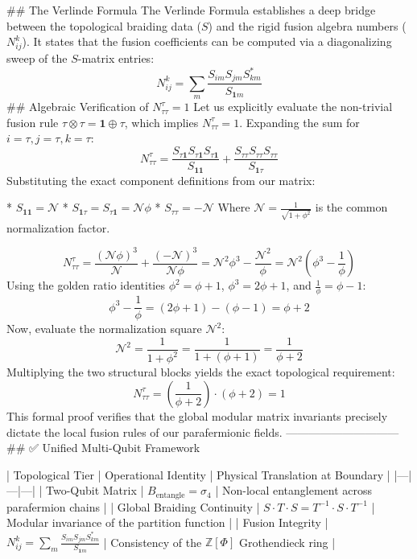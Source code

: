 ## The Verlinde Formula
The Verlinde Formula establishes a deep bridge between the topological braiding data ($S$) and the rigid fusion algebra numbers ($N_{ij}^k$). It states that the fusion coefficients can be computed via a diagonalizing sweep of the $S$-matrix entries:
$$N_{ij}^k = \sum_{m} \frac{S_{im} S_{jm} S_{km}^*}{S_{\mathbf{1}m}}$$ 
## Algebraic Verification of $N_{\tau\tau}^\tau = 1$
Let us explicitly evaluate the non-trivial fusion rule $\tau \otimes \tau = \mathbf{1} \oplus \tau$, which implies $N_{\tau\tau}^\tau = 1$. Expanding the sum for $i=\tau, j=\tau, k=\tau$:
$$N_{\tau\tau}^\tau = \frac{S_{\tau \mathbf{1}} S_{\tau \mathbf{1}} S_{\tau \mathbf{1}}}{S_{\mathbf{1}\mathbf{1}}} + \frac{S_{\tau \tau} S_{\tau \tau} S_{\tau \tau}}{S_{\mathbf{1}\tau}}$$ 
Substituting the exact component definitions from our matrix:

* $S_{\mathbf{1}\mathbf{1}} = \mathcal{N}$
* $S_{\mathbf{1}\tau} = S_{\tau \mathbf{1}} = \mathcal{N}\phi$
* $S_{\tau\tau} = -\mathcal{N}$
Where $\mathcal{N} = \frac{1}{\sqrt{1+\phi^2}}$ is the common normalization factor.

$$N_{\tau\tau}^\tau = \frac{(\mathcal{N}\phi)^3}{\mathcal{N}} + \frac{(-\mathcal{N})^3}{\mathcal{N}\phi} = \mathcal{N}^2 \phi^3 - \frac{\mathcal{N}^2}{\phi} = \mathcal{N}^2 \left( \phi^3 - \frac{1}{\phi} \right)$$ 
Using the golden ratio identities $\phi^2 = \phi + 1$, $\phi^3 = 2\phi + 1$, and $\frac{1}{\phi} = \phi - 1$:
$$\phi^3 - \frac{1}{\phi} = (2\phi + 1) - (\phi - 1) = \phi + 2$$ 
Now, evaluate the normalization square $\mathcal{N}^2$:
$$\mathcal{N}^2 = \frac{1}{1 + \phi^2} = \frac{1}{1 + (\phi + 1)} = \frac{1}{\phi + 2}$$ 
Multiplying the two structural blocks yields the exact topological requirement:
$$N_{\tau\tau}^\tau = \left( \frac{1}{\phi + 2} \right) \cdot (\phi + 2) = 1$$ 
This formal proof verifies that the global modular matrix invariants precisely dictate the local fusion rules of our parafermionic fields.
------------------------------
## ✅ Unified Multi-Qubit Framework

| Topological Tier | Operational Identity | Physical Translation at Boundary |
|---|---|---|
| Two-Qubit Matrix | $B_{\text{entangle}} = \sigma_4$ | Non-local entanglement across parafermion chains |
| Global Braiding Continuity | $S \cdot T \cdot S = T^{-1} \cdot S \cdot T^{-1}$ | Modular invariance of the partition function |
| Fusion Integrity | $N_{ij}^k = \sum_m \frac{S_{im}S_{jm}S_{km}^*}{S_{\mathbf{1}m}}$ | Consistency of the $\mathbb{Z}[\Phi]$ Grothendieck ring |

